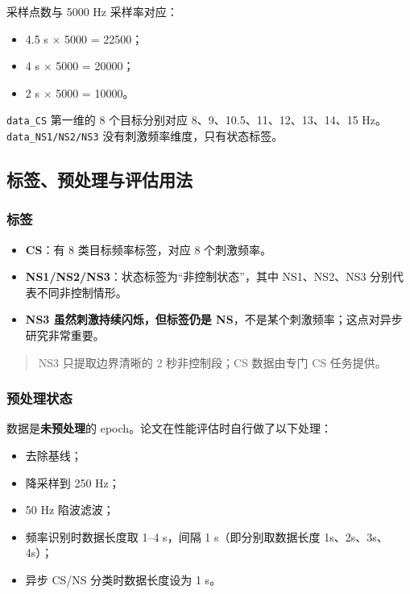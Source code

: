 \documentclass[12pt, a4paper]{ctexart}
\newcommand{\ttf}[1]{\texttt{#1}}
\begin{document}
采样点数与 5000 Hz 采样率对应：

\begin{itemize}
  \item 4.5 s $\times$ 5000 = 22500；
  \item 4 s $\times$ 5000 = 20000；
  \item 2 s $\times$ 5000 = 10000。
\end{itemize}

\ttf{data\_CS} 第一维的 8 个目标分别对应 8、9、10.5、11、12、13、14、15 Hz。\ttf{data\_NS1/NS2/NS3} 没有刺激频率维度，只有状态标签。

\subsection{标签、预处理与评估用法}

\subsubsection*{标签}

\begin{itemize}
  \item \textbf{CS}：有 8 类目标频率标签，对应 8 个刺激频率。
  \item \textbf{NS1/NS2/NS3}：状态标签为``非控制状态''，其中 NS1、NS2、NS3 分别代表不同非控制情形。
  \item \textbf{NS3 虽然刺激持续闪烁，但标签仍是 NS}，不是某个刺激频率；这点对异步研究非常重要。
\end{itemize}

\begin{quote}
NS3 只提取边界清晰的 2 秒非控制段；CS 数据由专门 CS 任务提供。
\end{quote}

\subsubsection*{预处理状态}

数据是\textbf{未预处理}的 epoch。论文在性能评估时自行做了以下处理：

\begin{itemize}
  \item 去除基线；
  \item 降采样到 250 Hz；
  \item 50 Hz 陷波滤波；
  \item 频率识别时数据长度取 1--4 s，间隔 1 s（即分别取数据长度 1s、2s、3s、4s）；
  \item 异步 CS/NS 分类时数据长度设为 1 s。
\end{itemize}
\end{document}
